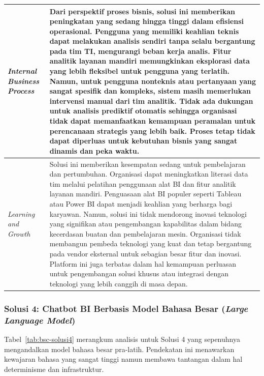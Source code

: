 \begin{longtable}{|p{3.5cm}|p{9cm}|}
\textit{Internal Business Process} & Dari perspektif proses bisnis, solusi ini memberikan peningkatan yang sedang hingga tinggi dalam efisiensi operasional. Pengguna yang memiliki keahlian teknis dapat melakukan analisis sendiri tanpa selalu bergantung pada tim TI, mengurangi beban kerja analis. Fitur analitik layanan mandiri memungkinkan eksplorasi data yang lebih fleksibel untuk pengguna yang terlatih. Namun, untuk pengguna nonteknis atau pertanyaan yang sangat spesifik dan kompleks, sistem masih memerlukan intervensi manual dari tim analitik. Tidak ada dukungan untuk analisis prediktif otomatis sehingga organisasi tidak dapat memanfaatkan kemampuan peramalan untuk perencanaan strategis yang lebih baik. Proses tetap tidak dapat diperluas untuk kebutuhan bisnis yang sangat dinamis dan peka waktu. \\
\hline

\textit{Learning and Growth} & Solusi ini memberikan kesempatan sedang untuk pembelajaran dan pertumbuhan. Organisasi dapat meningkatkan literasi data tim melalui pelatihan penggunaan alat BI dan fitur analitik layanan mandiri. Penguasaan alat BI populer seperti Tableau atau Power BI dapat menjadi keahlian yang berharga bagi karyawan. Namun, solusi ini tidak mendorong inovasi teknologi yang signifikan atau pengembangan kapabilitas dalam bidang kecerdasan buatan dan pembelajaran mesin. Organisasi tidak membangun pembeda teknologi yang kuat dan tetap bergantung pada vendor eksternal untuk sebagian besar fitur dan inovasi. Platform ini juga terbatas dalam hal kemampuan perluasan untuk pengembangan solusi khusus atau integrasi dengan teknologi yang lebih canggih di masa depan. \\
\hline

\end{longtable}

\subsubsection{Solusi 4: Chatbot BI Berbasis Model Bahasa Besar (\textit{Large Language Model})}

Tabel~\ref{tab:bsc-solusi4} merangkum analisis untuk Solusi 4 yang sepenuhnya mengandalkan model bahasa besar pra-latih. Pendekatan ini menawarkan kewajaran bahasa yang sangat tinggi namun membawa tantangan dalam hal determinisme dan infrastruktur.

